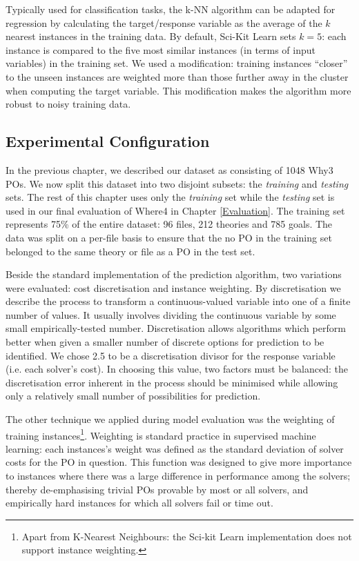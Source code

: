\sloppypar
Typically used for classification tasks, the k-NN algorithm can be adapted for regression by calculating the target/response variable as the average of the $k$ nearest instances in the training data.
By default, Sci-Kit Learn sets $k=5$: each instance is compared to the five most similar instances (in terms of input variables) in the training set.  
We used a modification: training instances ``closer'' to the unseen instances are weighted more than those further away in the cluster when computing the target variable.
This modification makes the algorithm more robust to noisy training data. 

\subsection{Experimental Configuration}
\label{sub:config}

In the previous chapter, we described our dataset as consisting of 1048 \textsf{Why3} POs.
We now split this dataset into two disjoint subsets: the \textit{training} and \textit{testing} sets. 
The rest of this chapter uses only the \textit{training} set while the \textit{testing} set is used in our final evaluation of \textsf{Where4} in Chapter \ref{Evaluation}.
The training set represents 75\% of the entire dataset: 96 files,   212 theories and 785 goals. 
The data was split on a per-file basis to ensure that the no PO in the training set belonged to the same theory or file as a PO in the test set. 

Beside the standard implementation of the prediction algorithm, two variations were evaluated: cost discretisation and instance weighting.
By discretisation we describe the process to transform a continuous-valued variable into one of a finite number of values. 
It usually involves dividing the continuous variable by some small empirically-tested number. 
Discretisation allows algorithms which perform better when given a smaller number of discrete options for prediction to be identified. 
We chose 2.5 to be a discretisation divisor for the response variable (i.e. each solver's cost).
In choosing this value, two factors must be balanced: the discretisation error inherent in the process should be minimised while allowing only a relatively small number of possibilities for prediction.

The other technique we applied during model evaluation was the weighting of training instances\footnote{Apart from K-Nearest Neighbours: the Sci-kit Learn implementation does not support instance weighting.}.
Weighting is standard practice in supervised machine learning: each instances's weight was defined as the standard deviation of solver costs for the PO in question. 
This function was designed to give more importance to instances where there was a large difference in performance among the solvers; thereby de-emphasising trivial POs provable by most or all solvers, and empirically hard instances for which all solvers fail or time out.  



